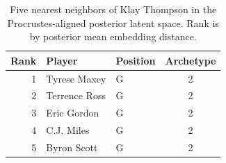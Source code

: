 \begin{table}[htbp]
  \centering\small
  \begin{tabular}{rllc}
    \toprule
    Rank & Player & Position & Archetype \\
    \midrule
    1 & Tyrese Maxey & G & 2 \\
    2 & Terrence Ross & G & 2 \\
    3 & Eric Gordon & G & 2 \\
    4 & C.J. Miles & G & 2 \\
    5 & Byron Scott & G & 2 \\
    \bottomrule
  \end{tabular}
  \caption{Five nearest neighbors of Klay Thompson in the Procrustes-aligned posterior latent space. Rank is by posterior mean embedding distance.}
  \label{tab:Klay_Thompson_neighbors}
\end{table}


